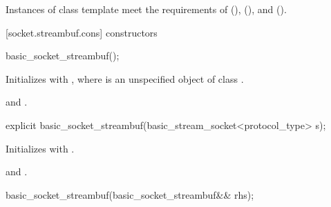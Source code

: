 \pnum
Instances of class template  meet the requirements of  (),  (), and  ().


[socket.streambuf.cons]{ constructors}

\begin{itemdecl}
basic_socket_streambuf();
\end{itemdecl}

\begin{itemdescr}
\pnum
\effects Initializes  with , where  is an unspecified object of class .

\pnum
\postconditions {} and .
\end{itemdescr}

\begin{itemdecl}
explicit basic_socket_streambuf(basic_stream_socket<protocol_type> s);
\end{itemdecl}

\begin{itemdescr}
\pnum
\effects Initializes  with .

\pnum
\postconditions {} and .
\end{itemdescr}

\begin{itemdecl}
basic_socket_streambuf(basic_socket_streambuf&& rhs);
\end{itemdecl}

